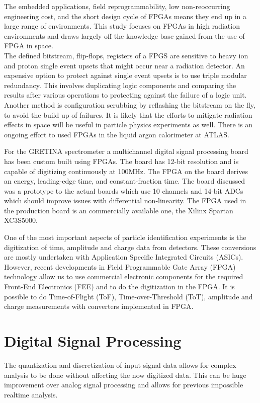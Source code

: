 \documentclass[12pt]{article}
\begin{document}
\begin{doublespacing}
{\large\textbf{\cite{Wirthlin}}}
The embedded applications, field reprogrammability, low non-reoccurring engineering cost, and the short design cycle of FPGAs means they end up in a large range of environments.
This study focuses on FPGAs in high radiation environments and draws largely off the knowledge base gained from the use of FPGA in space.
\\

The defined bitstream, flip-flops, registers of a FPGS are sensitive to heavy ion and proton single event upsets that might occur near a radiation detector.
An expensive option to protect against single event upsets is to use triple modular redundancy.
This involves duplicating logic components and comparing the results after various operations to protecting against the failure of a logic unit.
Another method is configuration scrubbing by reflashing the bitstream on the fly, to avoid the build up of failures.
It is likely that the efforts to mitigate radiation effects in space will be useful in particle physics experiments as well.
There is an ongoing effort to used FPGAs in the liquid argon calorimeter at ATLAS.

{\large\textbf{\cite{Cromaz2008233}}}
For the GRETINA spectrometer a multichannel digital signal processing board has been custom built using FPGAs.
The board has 12-bit resolution and is capable of digitizing continuously at 100MHz.
The FPGA on the board derives an energy, leading-edge time, and constant-fraction time.
The board discussed was a prototype to the actual boards which use 10 channels and 14-bit ADCs which should improve issues with differential non-linearity.
The FPGA used in the production board is an commercially available one, the Xilinx Spartan XC3S5000.


{\large\textbf{\cite{Ugur}}}
One of the most important aspects of particle identification experiments is the digitization of time, amplitude and charge data from detectors.
These conversions are mostly undertaken with Application Specific Integrated Circuits (ASICs). However, recent developments in Field Programmable Gate Array (FPGA) technology allow us to use commercial electronic components for the required Front-End Electronics (FEE) and to do the digitization in the FPGA.
It is possible to do Time-of-Flight (ToF), Time-over-Threshold (ToT), amplitude and charge measurements with converters implemented in FPGA.
\\[20pt]

\pagebreak
\section{Digital Signal Processing}   %
The quantization and discretization of input signal data allows for complex analysis to be done without affecting the now digitized data.
This can be huge improvement over analog signal processing and allows for previous impossible realtime analysis.
\\[20pt]



\end{doublespacing}
\end{document}
